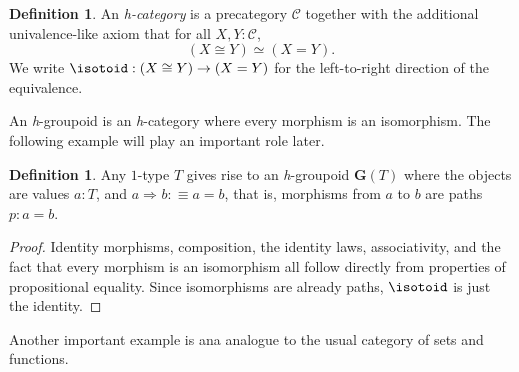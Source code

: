 \documentclass[preprint,authoryear]{sigplanconf}
\newcommand{\term}[1]{\emph{#1}}
\newcommand{\mcal}[1]{\ensuremath{\mathcal{#1}}}
\let\oldequiv\equiv
\newcommand{\jeq}{\oldequiv}          %
\newcommand{\defeq}{\mathrel{:\jeq}}  %
\renewcommand{\equiv}{\simeq}         %
\newcommand{\iso}{\cong}              %
\theoremstyle{definition}
\newtheorem{defn}[thm]{Definition}
\theoremstyle{remark}
\newcommand{\tygrpd}[1]{\ensuremath{\mathbf{G}(#1)}}
\newcommand{\hott}[1]{\textit{h}-#1}
\newcommand{\homsymb}{\Rightarrow}
\providecommand{\hom}{}
\renewcommand{\hom}[3][]{#2 \homsymb_{#1} #3}
\newcommand{\CT}{\mcal{C}}
\begin{document}
\begin{defn}
  An \term{\hott{category}} is a precategory $\CT$ together with the
  additional univalence-like axiom that for all $X,Y : \CT$, \[ (X \iso
  Y) \equiv (X = Y). \] We write $\isotoid : (X \iso Y) \to (X = Y)$
  for the left-to-right direction of the equivalence.
\end{defn}

An \hott{groupoid} is an \hott{category} where every morphism is an
isomorphism. The following example will play an important role later.

\begin{defn}
  Any $1$-type $T$ gives rise to an \hott{groupoid} $\tygrpd{T}$ where the
  objects are values $a : T$, and $\hom a b \defeq a = b$, that
  is, morphisms from $a$ to $b$ are paths $p : a = b$.
\end{defn}

\begin{proof}
  Identity morphisms, composition, the identity laws, associativity,
  and the fact that every morphism is an isomorphism all follow
  directly from properties of propositional equality.  Since
  isomorphisms are already paths, $\isotoid$ is just the identity.
\end{proof}

Another important example is ana analogue to the usual category \Set
of sets and functions.
\end{document}
